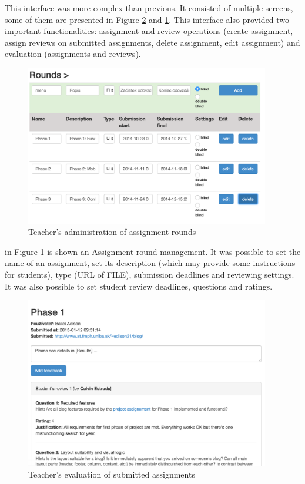 This interface was more complex than previous. It consisted of multiple screens, some of them are presented in Figure \ref{teachereval} and \ref{teacherrounds}. This interface also provided two important functionalities: assignment and review operations (create assignment, assign reviews on submitted assignments, delete assignment, edit assignment) and evaluation (assignments and reviews).



\begin{figure}[h]
    \centering
    \includegraphics[width=0.95\textwidth]{images/teacherrounds.png}
    \caption{Teacher's administration of assignment rounds}
    \label{teacherrounds}
\end{figure}


in Figure \ref{teacherrounds} is shown an Assignment round management. It was possible to set the name of an assignment, set its description (which may provide some instructions for students), type (URL of FILE), submission deadlines and reviewing settings. It was also possible to set student review deadlines, questions and ratings.

\begin{figure}[h]
    \centering
    \includegraphics[width=0.95\textwidth]{images/teachereval.png}
    \caption{Teacher's evaluation of submitted assignments}
    \label{teachereval}
\end{figure}



